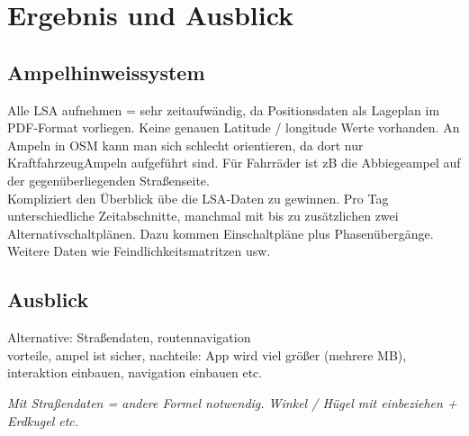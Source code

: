 \chapter{\label{chap:fazit}Ergebnis und Ausblick}
\section{Ampelhinweissystem}
Alle LSA aufnehmen = sehr zeitaufwändig, da Positionsdaten als Lageplan im \gls{PDF}-Format vorliegen. Keine genauen Latitude / longitude Werte vorhanden. An Ampeln in OSM kann man sich schlecht orientieren, da dort nur KraftfahrzeugAmpeln aufgeführt sind. Für Fahrräder ist zB die Abbiegeampel auf der gegenüberliegenden Straßenseite. \\
Kompliziert den Überblick übe die \gls{LSA}-Daten zu gewinnen. Pro Tag unterschiedliche Zeitabschnitte, manchmal mit bis zu zusätzlichen zwei Alternativschaltplänen. Dazu kommen Einschaltpläne plus Phasenübergänge. Weitere Daten wie Feindlichkeitsmatritzen usw.
\section{Ausblick}

Alternative: Straßendaten, routennavigation\\ vorteile, ampel ist sicher, nachteile:
App wird viel größer (mehrere MB),  interaktion einbauen, navigation einbauen etc. 

\textit{Mit Straßendaten = andere Formel notwendig. Winkel / Hügel mit einbeziehen + Erdkugel etc.}
